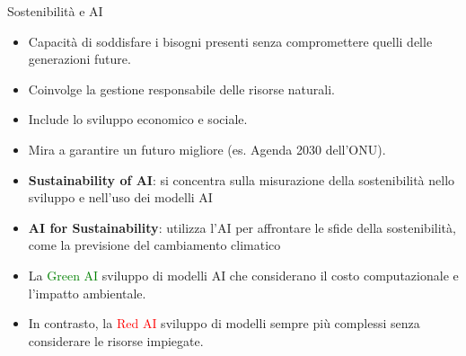 
\begin{frame}{Sostenibilità e AI} 
        \begin{itemize}
                \item Capacità di soddisfare i bisogni presenti senza compromettere quelli delle generazioni future.
                \item Coinvolge la gestione responsabile delle risorse naturali.
                \item Include lo sviluppo economico e sociale.
                \item Mira a garantire un futuro migliore (es. Agenda 2030 dell'ONU).
                    \item \textbf{Sustainability of AI}: si concentra sulla misurazione della sostenibilità nello sviluppo e nell'uso dei modelli AI
                    \item \textbf{AI for Sustainability}: utilizza l'AI per affrontare le sfide della sostenibilità, come la previsione del cambiamento climatico
                \item La \textcolor{green}{Green AI} sviluppo di modelli AI che considerano il costo computazionale e l'impatto ambientale.
                \item In contrasto, la \textcolor{red}{Red AI} sviluppo di modelli sempre più complessi senza considerare le risorse impiegate.
        \end{itemize}
\end{frame}
